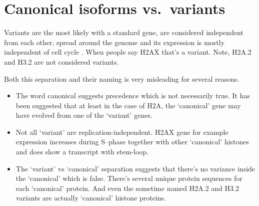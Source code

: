 \documentclass[10pt,a4paper,onecolumn,article]{memoir}
\newcommand{\addref}[1][]{\todo[color=red!40,size=\tiny]{Add reference: #1}}
\begin{document}

  \section{Canonical isoforms vs.~variants}

    Variants are the most likely with a standard gene, are considered independent from each other,
    spread around the genome and its expression is mostly independent of cell cycle . When people say H2AX that's
    a variant. Note, H2A.2 and H3.2 are not considered variants.

    Both this separation and their naming is very misleading 
    for several reasons.
    \begin{itemize}
      \item The word canonical suggests precedence which is not necessarily true. It has been
            suggested that at least in the case of H2A, the `canonical' gene may have evolved
            from one of the `variant' genes\addref.
      \item Not all `variant' are replication-independent. H2AX gene for example expression
            increases during S--phase together with other `canonical' histones and does show
            a transcript with stem-loop.
      \item The `variant' vs `canonical' separation suggests that there's no variance inside
            the `canonical' which is false. There's several unique protein sequences for each
            `canonical' protein. And even the sometime named H2A.2 and H3.2 variants are actually
            `canonical' histone proteins.
    \end{itemize}
\end{document}
